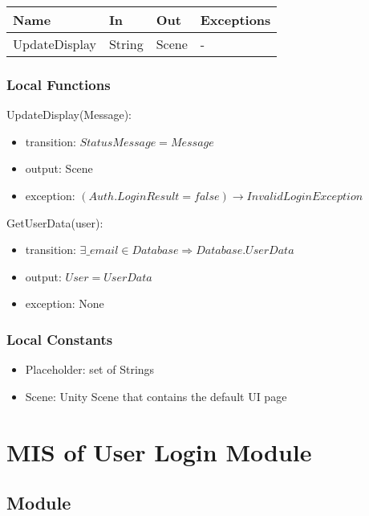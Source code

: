 \documentclass[12pt, titlepage]{article}
\begin{document}
\begin{center}
	\begin{tabular}{p{4cm} p{2cm} p{4cm} p{4cm}}
	\hline
	\textbf{Name} & \textbf{In} & \textbf{Out} & \textbf{Exceptions} \\
	\hline
	UpdateDisplay & String & Scene & - \\
	\hline
	\end{tabular}
\end{center}

\subsubsection{Local Functions}

\noindent UpdateDisplay(Message):
\begin{itemize}
\item transition: $StatusMessage = Message$ 
\item output: Scene
\item exception: $(Auth.LoginResult = false) \rightarrow InvalidLoginException$
\end{itemize}

\noindent GetUserData(user):
\begin{itemize}
\item transition: $\exists \_email \in Database \Rightarrow Database.UserData$
\item output: $User = UserData$
\item exception: None
\end{itemize}

\subsubsection{Local Constants}

\begin{itemize}
	\item Placeholder: set of Strings
	\item Scene: Unity Scene that contains the default UI page
\end{itemize}

\newpage

\section{MIS of User Login Module} \label{mLogin}

\subsection{Module}
\end{document}
